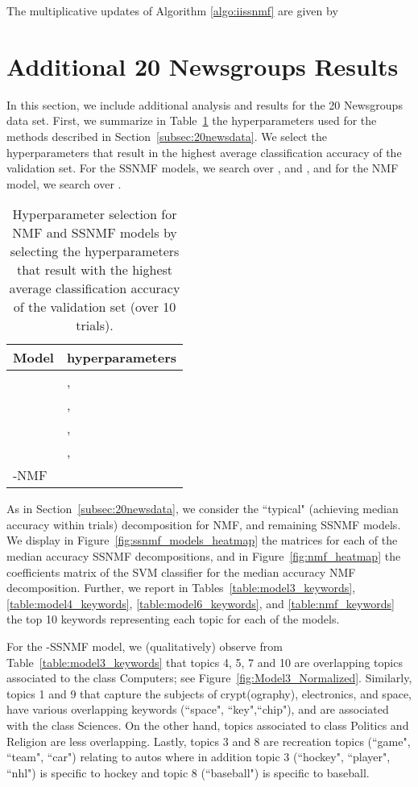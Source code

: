 \documentclass[twocolumn,10pt]{article}
\begin{document}
The multiplicative updates of Algorithm \ref{algo:iissnmf} are given by 





\section{Additional 20 Newsgroups Results}
\label{ap:20news}
In this section, we include additional analysis and results for the 20 Newsgroups data set.
First, we summarize in Table~\ref{table:model_parameters} the hyperparameters used for the methods described in Section~\ref{subsec:20newsdata}.
We select the hyperparameters that result in the highest average classification accuracy of the validation set. 
For the SSNMF models, we search over , and , and for the NMF model, we search over .
\begin{table}[htb]
\footnotesize
    \centering
{ \renewcommand{\arraystretch}{1.15}
\begin{tabular}{ l  l }
            \hline
            Model &\qquad hyperparameters \\
            \hline
             &\qquad ,  \\
             &\qquad , \\
             &\qquad ,  \\
             &\qquad ,  \\
            -NMF &\qquad \\
\hline
\end{tabular}}
\caption{Hyperparameter selection for NMF and SSNMF models by selecting the hyperparameters that result with the highest average classification accuracy of the validation set (over 10 trials).}
\label{table:model_parameters}
\end{table}

As in Section~\ref{subsec:20newsdata}, we consider the ``typical" (achieving median accuracy within trials) decomposition for NMF, and remaining SSNMF models. 
We display in Figure~\ref{fig:ssnmf_models_heatmap} the  matrices for each of the median accuracy SSNMF decompositions, and in Figure~\ref{fig:nmf_heatmap} the coefficients matrix of the SVM classifier for the median accuracy NMF decomposition.
Further, we report in Tables~\ref{table:model3_keywords}, \ref{table:model4_keywords}, 
\ref{table:model6_keywords}, and \ref{table:nmf_keywords} the top 10 keywords representing each topic for each of the models.

For the -SSNMF model, we (qualitatively) observe from Table~\ref{table:model3_keywords} that topics 4, 5, 7 and 10 are overlapping topics associated to the class Computers; see Figure~\ref{fig:Model3_Normalized}. 
Similarly, topics 1 and 9 that capture the subjects of crypt(ography), electronics, and space, have various overlapping keywords (``space", ``key",``chip"), and are associated with the class Sciences.
On the other hand, topics associated to class Politics and Religion are less overlapping.
Lastly, topics 3 and 8 are recreation topics (``game", ``team", ``car") relating to autos where in addition topic 3 (``hockey", ``player", ``nhl") is specific to hockey and topic 8 (``baseball") is specific to baseball.
\end{document}
